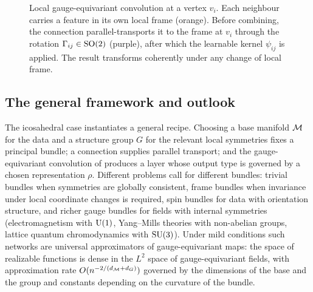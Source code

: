\begin{figure}[ht]
\centering
{}
\caption[Gauge-equivariant convolution on a mesh]{Local gauge-equivariant
convolution at a vertex $v_i$. Each neighbour carries a feature in its own local
frame (orange). Before combining, the connection parallel-transports it to the
frame at $v_i$ through the rotation $\Gamma_{ij} \in \operatorname{SO}(2)$ (purple), after
which the learnable kernel $\psi_{ij}$ is applied. The result transforms
coherently under any change of local frame.}
\label{fig:gauge:icosahedral}
\end{figure}

\subsection{The general framework and outlook}
\label{sec:gauge:outlook}

The icosahedral case instantiates a general recipe. Choosing a base manifold
$\mathcal{M}$ for the data and a structure group $G$ for the relevant local symmetries
fixes a principal bundle; a connection supplies parallel transport; and the
gauge-equivariant convolution of  produces a layer whose
output type is governed by a chosen representation $\rho$. Different problems
call for different bundles: trivial bundles when symmetries are globally
consistent, frame bundles when invariance under local coordinate changes is
required, spin bundles for data with orientation structure, and richer gauge
bundles for fields with internal symmetries (electromagnetism with $\operatorname{U}(1)$,
Yang--Mills theories with non-abelian groups, lattice quantum chromodynamics with
$\operatorname{SU}(3)$). Under mild conditions such networks are universal approximators of
gauge-equivariant maps: the space of realizable functions is dense in the
$L^2$ space of gauge-equivariant fields, with approximation rate
$O(n^{-2/(d_{\mathcal{M}} + d_G)})$ governed by the dimensions of the base and the group
and constants depending on the curvature of the bundle.

